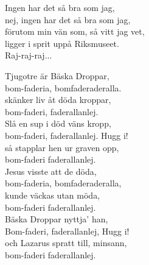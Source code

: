 \documentclass[a6paper, 10pt, twoside]{article}
\begin{document}
\noindent
\begin{center}
\end{center}
\begin{lyrics}
Ingen har det så bra som jag, \\
nej, ingen har det så bra som jag, \\
förutom min vän som, så vitt jag vet, \\
ligger i sprit uppå Riksmuseet. 
\vspace{5pt}\\
Raj-raj-raj... 
\end{lyrics}
\vspace{20pt}
\begin{center}
\end{center}
\begin{lyrics}
Tjugotre är Bäska Droppar, \\
bom-faderia, bomfaderaderalla. \\
skänker liv åt döda kroppar, \\
bom-faderi, faderallanlej. 
\vspace{5pt}\\
Slå en sup i död väns kropp, \\
bom-faderi, faderallanlej. Hugg i! \\
så stapplar hen ur graven opp, \\
bom-faderi faderallanlej. 
\vspace{5pt}\\
Jesus visste att de döda, \\
bom-faderia, bomfaderaderalla, \\
kunde väckas utan möda, \\
bom-faderi faderallanlej. 
\vspace{5pt}\\
Bäska Droppar nyttja' han, \\
Bom-faderi, faderallanlej, Hugg i! \\
och Lazarus spratt till, minsann, \\
bom-faderi faderallanlej. 
\end{lyrics}
\end{document}
